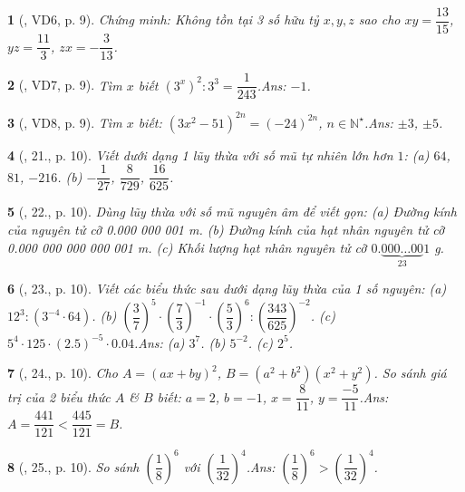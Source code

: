 \documentclass{article}
\newtheorem{baitoan}{}
\begin{document}
\begin{baitoan}[\cite{Tuyen_Toan_7}, VD6, p. 9]
	Chứng minh: Không tồn tại 3 số hữu tỷ $x,y,z$ sao cho $xy = \dfrac{13}{15}$, $yz = \dfrac{11}{3}$, $zx = -\dfrac{3}{13}$.
\end{baitoan}

\begin{baitoan}[\cite{Tuyen_Toan_7}, VD7, p. 9]
	Tìm $x$ biết $(3^x)^2:3^3 = \dfrac{1}{243}$.\hfill{\sf Ans: $-1$.}
\end{baitoan}

\begin{baitoan}[\cite{Tuyen_Toan_7}, VD8, p. 9]
	Tìm $x$ biết: $(3x^2 - 51)^{2n} = (-24)^{2n}$, $n\in\mathbb{N}^\star$.\hfill{\sf Ans: $\pm3$, $\pm5$.}
\end{baitoan}

\begin{baitoan}[\cite{Tuyen_Toan_7}, 21., p. 10]
	Viết dưới dạng 1 lũy thừa với số mũ tự nhiên lớn hơn $1$: (a) $64$, $81$, $-216$. (b) $-\dfrac{1}{27}$, $\dfrac{8}{729}$, $\dfrac{16}{625}$.
\end{baitoan}

\begin{baitoan}[\cite{Tuyen_Toan_7}, 22., p. 10]
	Dùng lũy thừa với số mũ nguyên âm để viết gọn: (a) Đường kính của nguyên tử cỡ {\rm0.000 000 001 m}. (b) Đường kính của hạt nhân nguyên tử cỡ {\rm0.000 000 000 000 001 m}. (c) Khối lượng hạt nhân nguyên tử cỡ $0.\underbrace{000\ldots 00}_{23}1$ {\rm g}.
\end{baitoan}

\begin{baitoan}[\cite{Tuyen_Toan_7}, 23., p. 10]
	Viết các biểu thức sau dưới dạng lũy thừa của 1 số nguyên: (a) $12^3:(3^{-4}\cdot 64)$. (b) $\left(\dfrac{3}{7}\right)^5\cdot\left(\dfrac{7}{3}\right)^{-1}\cdot\left(\dfrac{5}{3}\right)^6:\left(\dfrac{343}{625}\right)^{-2}$. (c) $5^4\cdot 125\cdot(2.5)^{-5}\cdot 0.04$.\hfill{\sf Ans: (a) $3^7$. (b) $5^{-2}$. (c) $2^5$.}
\end{baitoan}

\begin{baitoan}[\cite{Tuyen_Toan_7}, 24., p. 10]
	Cho $A = (ax + by)^2$, $B = (a^2 + b^2)(x^2 + y^2)$. So sánh giá trị của 2 biểu thức $A$ \& $B$ biết: $a = 2$, $b = -1$, $x = \dfrac{8}{11}$, $y = \dfrac{-5}{11}$.\hfill{\sf Ans: $A = \dfrac{441}{121} < \dfrac{445}{121} = B$.}
\end{baitoan}

\begin{baitoan}[\cite{Tuyen_Toan_7}, 25., p. 10]
	So sánh $\left(\dfrac{1}{8}\right)^6$ với $\left(\dfrac{1}{32}\right)^4$.\hfill{\sf Ans: $\left(\dfrac{1}{8}\right)^6 > \left(\dfrac{1}{32}\right)^4$.}
\end{baitoan}
\end{document}
